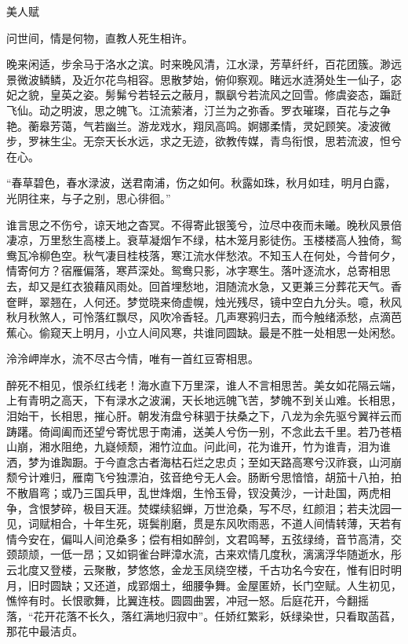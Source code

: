 {\kaishu
\begin{center}
\LARGE 美人赋
\end{center}
\par
{\centering 问世间，情是何物，直教人死生相许。

}
\par
晚来闲适，步余马于洛水之滨。时来晚风清，江水渌，芳草纤纤，百花团簇。渺远景微波鳞鳞，及近尔花鸟相容。思散梦始，俯仰察观。睹远水涟漪处生一仙子，宓妃之貌，皇英之姿。髣髴兮若轻云之蔽月，飘飖兮若流风之回雪。修虞姿态，蹁跹飞仙。动之明波，思之魄飞。江流萦渚，汀兰为之弥香。罗衣璀璨，百花与之争艳。蘅皋芳蔼，气若幽兰。游龙戏水，翔凤高鸣。婀娜柔情，灵妃顾笑。凌波微步，罗袜生尘。无奈天长水远，求之无迹，欲教传媒，青鸟衔恨，思若流波，怛兮在心。
\par
“春草碧色，春水渌波，送君南浦，伤之如何。秋露如珠，秋月如珪，明月白露，光阴往来，与子之别，思心徘徊。”
\par
谁言思之不伤兮，谅天地之杳冥。不得寄此银笺兮，泣尽中夜而未曦。晚秋风景倍凄凉，万里愁生高楼上。衰草凝烟乍不绿，枯木笼月影徒伤。玉楼楼高人独倚，鸳鸯瓦冷柳色空。秋气凄目桂枝落，寒江流水伴愁浓。不知玉人在何处，今昔何夕，情寄何方？宿雁偏落，寒芦深处。鸳鸯只影，冰字寒生。落叶逐流水，总寄相思去，却又是红衣狼藉风雨处。回首埋愁地，泪随流水急，又更兼三分葬花天气。香奩畔，翠翘在，人何还。梦觉晓来倚虚幌，烛光残尽，镜中空白九分头。噫，秋风秋月秋煞人，可怜落红飘尽，风吹冷香轻。几声寒鸦归去，而今触绪添愁，点滴芭蕉心。偷窥天上明月，小立人间风寒，共谁同圆缺。最是不胜一处相思一处闲愁。
\par
{\centering 泠泠岬岸水，流不尽古今情，唯有一首红豆寄相思。

}
\par
醉死不相见，恨杀红线老！海水直下万里深，谁人不言相思苦。美女如花隔云端，上有青明之高天，下有渌水之波澜，天长地远魄飞苦，梦魄不到关山难。长相思，泪始干，长相思，摧心肝。朝发洧盘兮秣驷于扶桑之下，八龙为余先驱兮翼祥云而踌躇。倚阊阖而还望兮寄忧思于南浦，送美人兮伤一别，不念此去千里。若乃苍梧山崩，湘水阻绝，九嶷倾颓，湘竹泣血。问此间，花为谁开，竹为谁青，泪为谁洒，梦为谁踟蹰。于今直念古者海枯石烂之忠贞；至如天路高寒兮汉祚衰，山河崩颓兮计难归，雁南飞兮独漂泊，弦音绝兮无人会。肠断兮思愔愔，胡笳十八拍，拍不散眉弯；或乃三国兵甲，乱世烽烟，生怜玉骨，钗没黄沙，一计赴国，两虎相争，含恨梦碎，极目天涯。焚蝶续貂蝉，万世沧桑，写不尽，红颜泪；若夫沈园一见，词赋相合，十年生死，斑鬓削磨，贯是东风吹雨恶，不道人间情转薄，天若有情今安在，偏叫人间沧桑多；偿有相如醉剑，文君鸣琴，五弦绿绮，音节高清，交颈颉颃，一低一昂；又如铜雀台畔漳水流，古来欢情几度秋，漓漓浮华随逝水，彤云北度又登楼，云聚散，梦悠悠，金龙玉凤绕空楼，千古功名今安在，惟有旧时明月，旧时圆缺；又还道，成郢烟土，细腰争舞。金屋匿娇，长门空赋。人生初见，憔悴有时。长恨歌舞，比翼连枝。圆圆曲罢，冲冠一怒。后庭花开，今翻摇落，“花开花落不长久，落红满地归寂中”。任娇红繁彩，妖绿染世，只看取菡萏，那花中最洁贞。

}
% 
